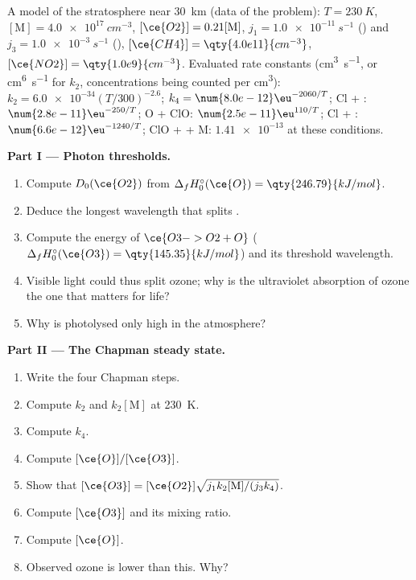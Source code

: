 \begin{problem}
\label{pb:b3:photochemistry:1}
A model of the stratosphere near \qty{30}{km} (data of the problem): $T = \qty{230}{K}$, $[\mathrm M] =
\qty{4.0e17}{cm^{-3}}$, $[\ce{O2}] = 0.21[\mathrm M]$,  $j_1 = \qty{1.0e-11}{s^{-1}}$ ()
and $j_3 = \qty{1.0e-3}{s^{-1}}$ (), $[\ce{CH4}] = \qty{4.0e11}{cm^{-3}}$, $[\ce{NO2}] = \qty{1.0e9}{cm^{-3}}$. Evaluated rate
constants (\unit{cm^3.s^{-1}}, or \unit{cm^6.s^{-1}} for $k_2$, concentrations being counted per \unit{cm^3}):
$k_2 = \num{6.0e-34}(T/300)^{-2.6}$; $k_4 = \num{8.0e-12}\eu^{-2060/T}$; Cl + : $\num{2.8e-11}\eu^{-250/T}$;
O + ClO: $\num{2.5e-11}\eu^{110/T}$; Cl + : $\num{6.6e-12}\eu^{-1240/T}$; ClO +  + M: $\num{1.41e-13}$ at
these conditions.

\medskip\noindent\textbf{Part I --- Photon thresholds.}
\begin{enumerate}
  \item Compute $D_0(\ce{O2})$ from $\Delta_fH^\circ_0(\ce{O}) = \qty{246.79}{kJ/mol}$.
  \item Deduce the longest wavelength that splits .
  \item Compute the energy of $\ce{O3 -> O2 + O}$ ($\Delta_fH^\circ_0(\ce{O3}) = \qty{145.35}{kJ/mol}$) and its
        threshold wavelength.
  \item Visible light could thus split ozone; why is the ultraviolet absorption
        of ozone the one that matters for life?
  \item Why is  photolysed only high in the atmosphere?
\end{enumerate}

\medskip\noindent\textbf{Part II --- The Chapman steady state.}
\begin{enumerate}[resume]
  \item Write the four Chapman steps.
  \item Compute $k_2$ and $k_2[\mathrm M]$ at \qty{230}{K}.
  \item Compute $k_4$.
  \item Compute $[\ce{O}]/[\ce{O3}]$.
  \item Show that $[\ce{O3}] = [\ce{O2}]\sqrt{j_1k_2[\mathrm M]/(j_3k_4)}$.
  \item Compute $[\ce{O3}]$ and its mixing ratio.
  \item Compute $[\ce{O}]$.
  \item Observed ozone is lower than this. Why?
\end{enumerate}


\end{problem}
